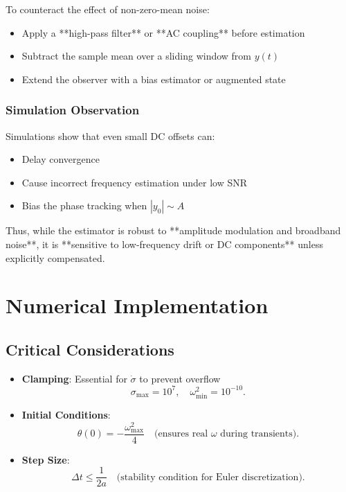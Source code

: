 \documentclass[11pt,letterpaper]{article}
\begin{document}
To counteract the effect of non-zero-mean noise:

\begin{itemize}
  \item Apply a **high-pass filter** or **AC coupling** before estimation
  \item Subtract the sample mean over a sliding window from \(y(t)\)
  \item Extend the observer with a bias estimator or augmented state
\end{itemize}

\subsubsection*{Simulation Observation}

Simulations show that even small DC offsets can:
\begin{itemize}
  \item Delay convergence
  \item Cause incorrect frequency estimation under low SNR
  \item Bias the phase tracking when \(|y_0| \sim A\)
\end{itemize}

Thus, while the estimator is robust to **amplitude modulation and broadband noise**, it is **sensitive to low-frequency drift or DC components** unless explicitly compensated.

\section{Numerical Implementation}

\subsection{Critical Considerations}
\begin{itemize}
  \item \textbf{Clamping}: Essential for \(\dot{\sigma}\) to prevent overflow  
  \[
    \sigma_{\max} = 10^7,\quad \omega_{\min}^2 = 10^{-10}.
  \]
  \item \textbf{Initial Conditions}:
  \[
    \theta(0) = -\frac{\omega_{\max}^2}{4}
    \quad\text{(ensures real \(\omega\) during transients)}.
  \]
  \item \textbf{Step Size}:
  \[
    \Delta t \le \frac{1}{2a}
    \quad\text{(stability condition for Euler discretization)}.
  \]
\end{itemize}
\end{document}
